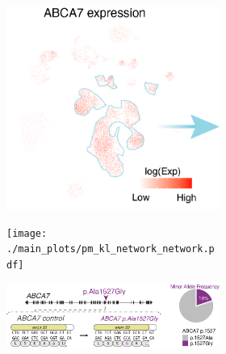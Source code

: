 \begin{figure}[ht]
    \begin{subfigure}[t]{0.45\textwidth}
        \begin{subfigure}[t]{0.49\textwidth}
            \caption{}
            \includegraphics[width=\textwidth]{./main_plots/cell_projection_abca7_expression.png}        
        \end{subfigure}
        \begin{subfigure}[t]{0.49\textwidth}
            \caption{}
            \texttt{[image: ./main\_plots/pm\_kl\_network\_network.pdf]}        
        \end{subfigure}
        \begin{subfigure}[t]{\textwidth}
            \caption{}
            \includegraphics[width=\textwidth]{./main_plots/common_variant_cartoon.png}        
        \end{subfigure}
    \end{subfigure}
    \begin{subfigure}[t]{0.45\textwidth}

\end{subfigure}
\end{figure}
